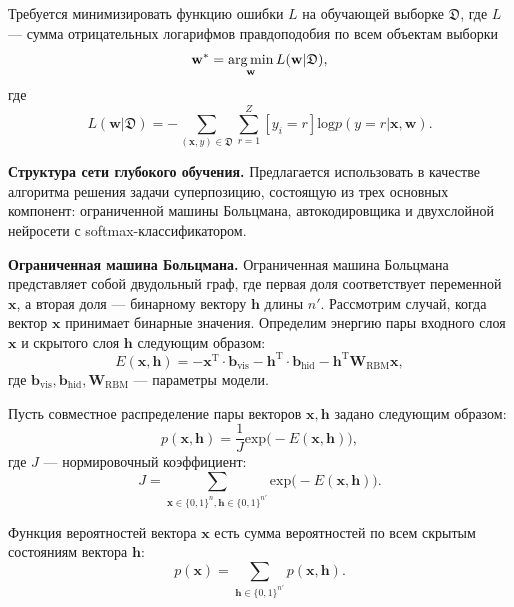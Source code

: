 Требуется минимизировать функцию ошибки $L$ на обучающей выборке $\mathfrak{D}$,
где $L$ --- сумма отрицательных логарифмов правдоподобия по всем объектам выборки
\[
\mathbf{w}^{*} = \operatorname*{arg\,min}_\mathbf{w} L(\mathbf{w}|\mathfrak{D}),
\]
где
\[
 L(\mathbf{w}|\mathfrak{D}) = -\sum_{(\mathbf{x},y) \in \mathfrak{D} } \sum_{r=1}^Z [y_i = r] \text{log} p(y=r|\mathbf{x},\mathbf{w}).
\]

\textbf{Структура сети глубокого обучения. }
Предлагается использовать в качестве алгоритма решения задачи суперпозицию, состоящую из трех основных компонент:
ограниченной машины Больцмана, автокодировщика и двухслойной нейросети с softmax-классификатором.

\textbf{Ограниченная машина Больцмана.}
Ограниченная машина Больцмана представляет собой двудольный граф, где первая доля соответствует переменной $\mathbf{x}$, а вторая доля --- бинарному вектору $\mathbf{h}$ длины $n'$.
Рассмотрим случай, когда вектор $\mathbf{x}$ принимает бинарные значения. Определим энергию пары входного слоя $\mathbf{x}$ и скрытого слоя $\mathbf{h}$ следующим образом:
\[
 E(\mathbf{x},\mathbf{h}) = -\mathbf{x}^\text{T} \cdot \mathbf{b}_\text{vis} -\mathbf{h}^\text{T} \cdot \mathbf{b}_\text{hid} - \mathbf{h}^\text{T}\mathbf{W}_\text{RBM}\mathbf{x},
\]
где $\mathbf{b}_\text{vis}, \mathbf{b}_\text{hid}, \mathbf{W}_\text{RBM}$ --- параметры модели.

Пусть совместное распределение пары векторов $\mathbf{x}, \mathbf{h}$ задано следующим образом:
\[
	p(\mathbf{x}, \mathbf{h}) = \frac{1}{J} \text{exp}\bigl(-E(\mathbf{x},\mathbf{h})\bigr),
\]
где $J$ --- нормировочный коэффициент:
\[
 J = \sum_{\mathbf{x} \in \{0,1\}^n, \mathbf{h}\in \{0,1\}^{n'}} \text{exp}\bigl(-E(\mathbf{x},\mathbf{h})\bigr).
\]


Функция вероятностей вектора $\mathbf{x}$ есть сумма вероятностей по всем скрытым состояниям вектора $\mathbf{h}$:
\[
	p(\mathbf{x}) = \sum_{\mathbf{h}\in \{0,1\}^{n'}} p(\mathbf{x}, \mathbf{h}).
\]

